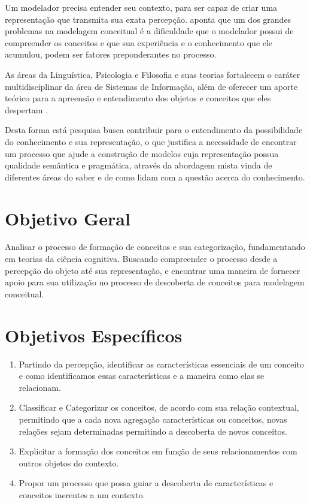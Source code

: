 Um modelador precisa entender seu contexto, para ser capaz de criar uma representação que transmita sua exata percepção.  aponta que um dos grandes problemas na modelagem conceitual é a dificuldade que o modelador possui de compreender os conceitos e que sua experiência e o conhecimento que ele acumulou, podem ser fatores preponderantes no processo.

As áreas da Linguística, Psicologia e Filosofia e suas teorias fortalecem o caráter multidisciplinar da área de Sistemas de Informação, além de oferecer um aporte teórico para a apreensão e entendimento dos objetos e conceitos que eles despertam \cite{lacerda:2012.linguagem}. 

Desta forma está pesquisa busca contribuir para o entendimento da possibilidade do conhecimento e sua representação, o que justifica a necessidade de encontrar um processo que ajude a construção de modelos cuja representação possua qualidade semântica e pragmática, através da abordagem mista vinda de diferentes áreas do saber e de como lidam com a questão acerca do conhecimento.

\section{Objetivo Geral}
\label{sec:objetivoGeral}

Analisar o processo de formação de conceitos e sua categorização, fundamentando em teorias da ciência cognitiva. Buscando compreender o processo desde a percepção do objeto até sua representação, e encontrar uma maneira de fornecer apoio para sua utilização no processo de descoberta de conceitos para modelagem conceitual.

\section{Objetivos Específicos}
\label{sec:objetivoEspecifico}

\begin{enumerate}
\item Partindo da percepção, identificar as características essenciais de um conceito e como identificamos essas características e a maneira como elas se relacionam.
\item Classificar e Categorizar os conceitos, de acordo com sua relação contextual, permitindo que a cada nova agregação  características ou conceitos, novas relações sejam determinadas permitindo a descoberta de novos conceitos.
\item Explicitar a formação dos conceitos em função de seus relacionamentos com outros objetos do contexto.
\item Propor um processo que possa guiar a descoberta de características e conceitos inerentes a um contexto.
\end{enumerate}

